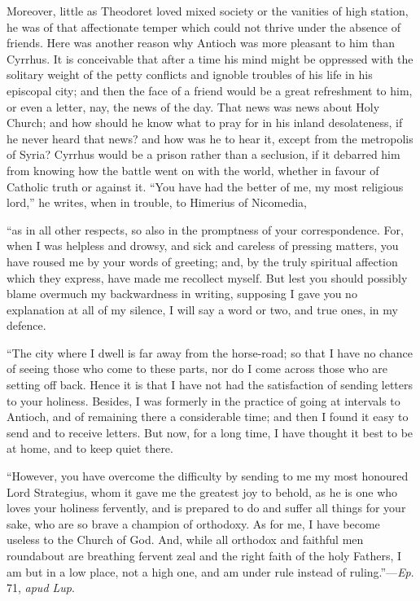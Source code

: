 Moreover, little as Theodoret loved mixed society or the vanities
of high station, he was of that affectionate temper which could not
thrive under the absence of friends. Here was another reason why
Antioch was more pleasant to him than Cyrrhus. It is conceivable that
after a time his mind might be oppressed with the solitary weight of
the petty conflicts and ignoble troubles of his life in his episcopal
city; and then the face of a friend would be a great refreshment to
him, or even a letter, nay, the news of the day. That news was news
about Holy Church; and how should he know what to pray for in his
inland desolateness, if he never heard that news? and how was he to
hear it, except from the metropolis of Syria? Cyrrhus would be a
prison rather than a seclusion, if it debarred him from knowing
how the battle went on with the world, whether in favour of Catholic
truth or against it. ``You have had the better of me, my most
religious lord,'' he writes, when in trouble, to Himerius of
Nicomedia,

``as in all other respects, so also in the promptness of your
correspondence. For, when I was helpless and drowsy, and sick and
careless of pressing matters, you have roused me by your words of
greeting; and, by the truly spiritual affection which they express,
have made me recollect myself. But lest you should possibly blame
overmuch my backwardness in writing, supposing I gave you no
explanation at all of my silence, I will say a word or two, and true
ones, in my defence.

``The city where I dwell is far away from the horse-road; so
that I have no chance of seeing those who come to these parts, nor do
I come across those who are setting off back. Hence it is that I have
not had the satisfaction of sending letters to your holiness. Besides,
I was formerly in the practice of going at intervals to Antioch, and
of remaining there a considerable time; and then I found it easy to
send and to receive letters. But now, for a long time, I have thought
it best to be at home, and to keep quiet there.

``However, you have overcome the difficulty by sending to me my
most honoured Lord Strategius, whom it gave me the greatest joy to
behold, as he is one who loves your holiness fervently, and is
prepared to do and suffer all things for your sake, who are so brave a
champion of orthodoxy. As for me, I have become useless to the Church
of God. And, while all orthodox and faithful men roundabout are
breathing fervent zeal and the right faith of the holy Fathers, I am
but in a low place, not a high one, and am under rule instead of
ruling.''—\emph{Ep}. 71, \emph{apud Lup}.

